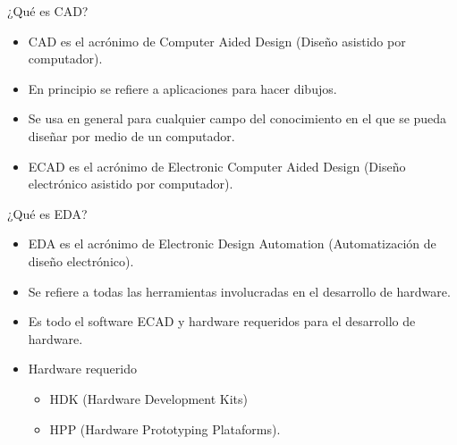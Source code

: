 \documentclass{beamer}
\begin{document}
\begin{frame}{¿Qué es CAD?}
  \begin{itemize}
  \item CAD es el acrónimo de Computer Aided Design (Diseño asistido por computador).
  \item En principio se refiere a aplicaciones para hacer dibujos.
  \item Se usa en general para cualquier campo del conocimiento en el que se pueda diseñar por medio de un computador.
  \item ECAD es el acrónimo de Electronic Computer Aided Design (Diseño electrónico asistido por computador).
  \end{itemize}
\end{frame}

\begin{frame}{¿Qué es EDA?}
  \begin{itemize}
  \item EDA es el acrónimo de Electronic Design Automation (Automatización de diseño electrónico).
  \item Se refiere a todas las herramientas involucradas en el desarrollo de hardware.
  \item Es todo el software ECAD y hardware requeridos para el desarrollo de hardware.
  \item Hardware requerido
    \begin{itemize}
    \item HDK (Hardware Development Kits)
    \item HPP (Hardware Prototyping Plataforms).
    \end{itemize}
  \end{itemize}
\end{frame}
\end{document}
